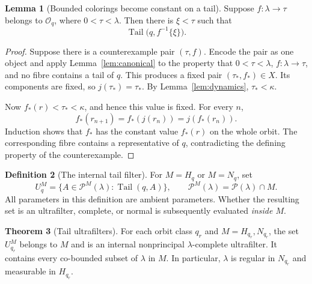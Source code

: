 \documentclass[11pt,letterpaper]{article}
\theoremstyle{definition}
\newtheorem{definition}{Definition}[section]
\newtheorem{theorem}[definition]{Theorem}
\newtheorem{lemma}[definition]{Lemma}
\numberwithin{equation}{section}
\newcommand{\Pow}{\mathcal P}
\newcommand{\Tail}{\operatorname{Tail}}
\newcommand{\powM}[2]{\mathcal P^{#1}(#2)}
\begin{document}
\begin{lemma}[Bounded colorings become constant on a tail]\label{lem:color}
Suppose $f:\lambda\to\tau$ belongs to $\mathcal O_q$, where $0<\tau<\lambda$. Then there is $\xi<\tau$ such that
\[
 \Tail\bigl(q,f^{-1}\{\xi\}\bigr).
\]
\end{lemma}

\begin{proof}
Suppose there is a counterexample pair $(\tau,f)$. Encode the pair as one object and apply Lemma~\ref{lem:canonical} to the property that $0<\tau<\lambda$, $f:\lambda\to\tau$, and no fibre contains a tail of $q$. This produces a fixed pair $(\tau_*,f_*)\in X$. Its components are fixed, so $j(\tau_*)=\tau_*$. By Lemma~\ref{lem:dynamics}, $\tau_*<\kappa$.

Now $f_*(r)<\tau_*<\kappa$, and hence this value is fixed. For every $n$,
\[
 f_*(r_{n+1})=f_*(j(r_n))=j(f_*(r_n)).
\]
Induction shows that $f_*$ has the constant value $f_*(r)$ on the whole orbit. The corresponding fibre contains a representative of $q$, contradicting the defining property of the counterexample.
\end{proof}

\begin{definition}[The internal tail filter]
For $M=H_q$ or $M=N_q$, set
\begin{equation}\label{eq:measure}
 U_q^M=\{A\in\powM{M}{\lambda}:\Tail(q,A)\},\qquad
 \powM{M}{\lambda}=\Pow(\lambda)\cap M.
\end{equation}
All parameters in this definition are ambient parameters. Whether the resulting set is an ultrafilter, complete, or normal is subsequently evaluated \emph{inside $M$}.
\end{definition}

\begin{theorem}[Tail ultrafilters]\label{thm:complete}
For each orbit class $q_r$ and $M=H_{q_r},N_{q_r}$, the set $U_{q_r}^M$ belongs to $M$ and is an internal nonprincipal $\lambda$-complete ultrafilter. It contains every co-bounded subset of $\lambda$ in $M$. In particular, $\lambda$ is regular in $N_{q_r}$ and measurable in $H_{q_r}$.
\end{theorem}
\end{document}
